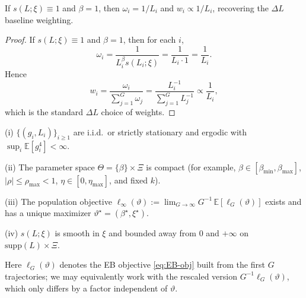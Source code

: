 \begin{proposition}
\label{prop:deltaL}
If \(s(L;\xi)\equiv 1\) and \(\beta=1\), then \(\omega_i=1/L_i\) and \(w_i \propto 1/L_i\), recovering the \(\Delta L\) baseline weighting.
\end{proposition}
\begin{proof}
If \(s(L;\xi)\equiv 1\) and \(\beta=1\), then for each \(i\),
\[
\omega_i
=\frac{1}{L_i^{\beta}s(L_i;\xi)}
=\frac{1}{L_i\cdot 1}
=\frac{1}{L_i}.
\]
Hence
\[
w_i
=\frac{\omega_i}{\sum_{j=1}^G \omega_j}
=\frac{L_i^{-1}}{\sum_{j=1}^G L_j^{-1}}
\propto \frac{1}{L_i},
\]
which is the standard \(\Delta L\) choice of weights.
\end{proof}

\begin{assumption}
\label{assump:reg}
(i) \(\{(g_i,L_i)\}_{i\ge 1}\) are i.i.d.\ or strictly stationary and ergodic with \(\sup_i \mathbb E[g_i^4]<\infty\).  

(ii) The parameter space \(\Theta=\{\beta\}\times\Xi\) is compact (for example, \(\beta\in[\beta_{\min},\beta_{\max}]\), \(|\rho|\le \rho_{\max}<1\), \(\eta\in[0,\eta_{\max}]\), and fixed \(k\)).  

(iii) The population objective \(\ell_\infty(\vartheta):=\lim_{G\to\infty}G^{-1}\,\mathbb E[\ell_G(\vartheta)]\) exists and has a unique maximizer \(\vartheta^\star=(\beta^\star,\xi^\star)\).  

(iv) \(s(L;\xi)\) is smooth in \(\xi\) and bounded away from \(0\) and \(+\infty\) on \(\mathrm{supp}(L)\times\Xi\).
\end{assumption}

Here \(\ell_G(\vartheta)\) denotes the EB objective \eqref{eq:EB-obj} built from the first \(G\) trajectories; we may equivalently work with the rescaled version \(G^{-1}\ell_G(\vartheta)\), which only differs by a factor independent of \(\vartheta\).

